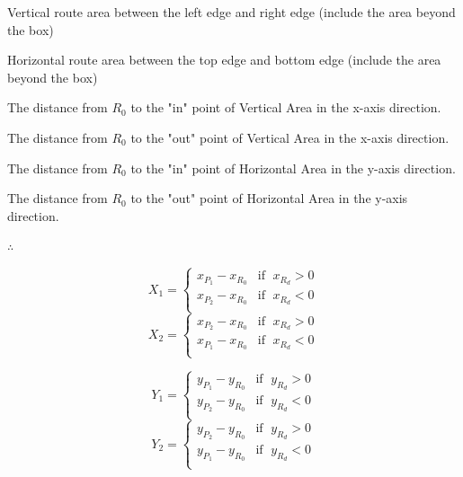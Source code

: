 \begin{description}
	\setlength{\parskip}{0pt}
	\item[$\bullet$ Vertical Area] Vertical route area between the left edge and right edge (include the area beyond the box)
	\item[$\bullet$ Horizontal Area] Horizontal route area between the top edge and bottom edge (include the area beyond the box)
	\item[$\bullet$ $\mathbf{X}_1$] The distance from $R_0$ to the "in" point of Vertical Area in the x-axis direction.   
	\item[$\bullet$ $\mathbf{X}_2$] The distance from $R_0$ to the "out" point of Vertical Area in the x-axis direction. 
	\item[$\bullet$ $\mathbf{Y}_1$] The distance from $R_0$ to the "in" point of Horizontal Area in the y-axis direction.
	\item[$\bullet$ $\mathbf{Y}_2$] The distance from $R_0$ to the "out" point of Horizontal Area in the y-axis direction. 
\end{description}

$\therefore$

\begin{multicols}{2}
\noindent
	\[
	X_1 =
	\begin{cases}
	x_{P_1} - x_{R_0} & \text{if }\;x_{R_d} > 0\\
	x_{P_2} - x_{R_0} & \text{if }\;x_{R_d} < 0\\
	\end{cases}
	\]
\columnbreak
	\[
	X_2 =
	\begin{cases}
	x_{P_2} - x_{R_0} & \text{if }\;x_{R_d} > 0\\
	x_{P_1} - x_{R_0} & \text{if }\;x_{R_d} < 0\\
	\end{cases}
	\]
\end{multicols}

\begin{multicols}{2}
\noindent
	\[
	Y_1 =
	\begin{cases}
	y_{P_1} - y_{R_0} & \text{if }\;y_{R_d} > 0\\
	y_{P_2} - y_{R_0} & \text{if }\;y_{R_d} < 0\\
	\end{cases}
	\]
\columnbreak
	\[
	Y_2 =
	\begin{cases}
	y_{P_2} - y_{R_0} & \text{if }\;y_{R_d} > 0\\
	y_{P_1} - y_{R_0} & \text{if }\;y_{R_d} < 0\\
	\end{cases}
	\]
\end{multicols}

